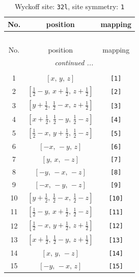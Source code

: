 \documentclass[fleqn,8pt]{jsarticle}
\begin{document}
\renewcommand{\arraystretch}{1.2}
\begin{longtable}{ccc}
\caption{Wyckoff site: {\tt 32l}, site symmetry: {\tt 1}}
 \\
 \hline \hline
No. & position & mapping \\ \hline \endfirsthead

\multicolumn{2}{l}{\tablename\ \thetable{}} \\
 \hline \hline
No. & position & mapping \\ \hline \endhead

 \hline \hline
\multicolumn{2}{r}{\footnotesize\it continued ...} \\ \endfoot

 \hline \hline
\multicolumn{2}{r}{} \\ \endlastfoot

1 & $\left[ x,\, y,\, z \right]$ & {\tt [1]} \\ \hline
2 & $\left[ \frac{1}{2} - y,\, x + \frac{1}{2},\, z + \frac{1}{2} \right]$ & {\tt [2]} \\ \hline
3 & $\left[ y + \frac{1}{2},\, \frac{1}{2} - x,\, z + \frac{1}{2} \right]$ & {\tt [3]} \\ \hline
4 & $\left[ x + \frac{1}{2},\, \frac{1}{2} - y,\, \frac{1}{2} - z \right]$ & {\tt [4]} \\ \hline
5 & $\left[ \frac{1}{2} - x,\, y + \frac{1}{2},\, \frac{1}{2} - z \right]$ & {\tt [5]} \\ \hline
6 & $\left[ - x,\, - y,\, z \right]$ & {\tt [6]} \\ \hline
7 & $\left[ y,\, x,\, - z \right]$ & {\tt [7]} \\ \hline
8 & $\left[ - y,\, - x,\, - z \right]$ & {\tt [8]} \\ \hline
9 & $\left[ - x,\, - y,\, - z \right]$ & {\tt [9]} \\ \hline
10 & $\left[ y + \frac{1}{2},\, \frac{1}{2} - x,\, \frac{1}{2} - z \right]$ & {\tt [10]} \\ \hline
11 & $\left[ \frac{1}{2} - y,\, x + \frac{1}{2},\, \frac{1}{2} - z \right]$ & {\tt [11]} \\ \hline
12 & $\left[ \frac{1}{2} - x,\, y + \frac{1}{2},\, z + \frac{1}{2} \right]$ & {\tt [12]} \\ \hline
13 & $\left[ x + \frac{1}{2},\, \frac{1}{2} - y,\, z + \frac{1}{2} \right]$ & {\tt [13]} \\ \hline
14 & $\left[ x,\, y,\, - z \right]$ & {\tt [14]} \\ \hline
15 & $\left[ - y,\, - x,\, z \right]$ & {\tt [15]} \\ \hline

\end{longtable}
\end{document}
